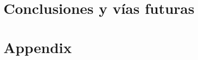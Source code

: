 \documentclass[ twoside,openright,titlepage,numbers=noenddot,headinclude,%
                footinclude=true,cleardoublepage=empty,abstractoff, %
                BCOR=5mm,paper=a4,fontsize=11pt,%
                ngerman,american,%
                ]{scrreprt}
\begin{document}
\part{Conclusiones y vías futuras}
\appendix
\cleardoublepage
\part{Appendix}
%
\cleardoublepage
\cleardoublepage
\cleardoublepage
\end{document}
